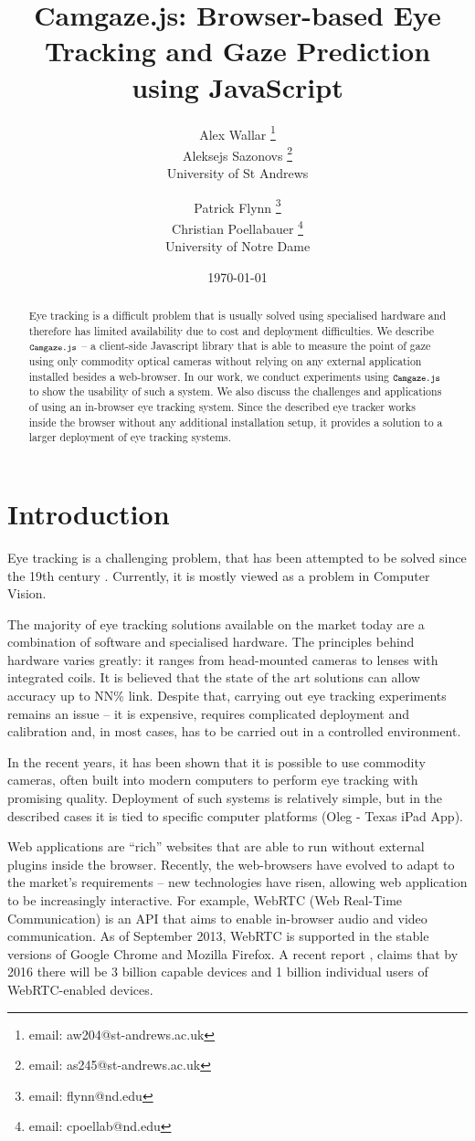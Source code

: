 \documentclass[annual]{acmsiggraph}
\title{Camgaze.js: Browser-based Eye Tracking and Gaze Prediction using
JavaScript}
\author{Alex Wallar \thanks{email: aw204@st-andrews.ac.uk} \\ Aleksejs Sazonovs
\thanks{email: as245@st-andrews.ac.uk} \\ University of St Andrews \and Patrick
Flynn \thanks{email: flynn@nd.edu} \\ Christian Poellabauer \thanks{email:
cpoellab@nd.edu} \\ University of Notre Dame}
\date{\today}
\newcommand{\Acronym}[1]{\ensuremath{{\small{\texttt{#1}}}}}
\newcommand{\Name}{\Acronym{Camgaze.js}} \newcommand{\False}{\Constant{false}}
\newcommand{\Constant}[1]{\ensuremath{\small{\texttt{#1}}}}
\begin{document}
\maketitle

\begin{abstract}

Eye tracking is a difficult problem that is usually solved using specialised
hardware and therefore has limited availability due to cost and deployment
difficulties. We describe $\Name$ – a client-side Javascript library that is
able to measure the point of gaze using only commodity optical cameras without
relying on any external application installed besides a web-browser. In our work,
we conduct experiments using $\Name$ to show the usability of such a system.
We also discuss the challenges and applications of using an in-browser eye
tracking system. Since the described eye tracker works inside the browser
without any additional installation setup, it provides a solution to a larger
deployment of eye tracking systems.

\end{abstract}

\section{Introduction}

Eye tracking is a challenging problem, that has been attempted to be solved
since the 19th century \cite{Ahrens1891}. Currently, it is mostly viewed as a
problem in Computer Vision.

The majority of eye tracking solutions available on the market today are a
combination of software and specialised hardware. The principles behind
hardware varies greatly: it ranges from head-mounted cameras to lenses with
integrated coils. It is believed that the state of the art solutions can allow
accuracy up to NN\% {link}. Despite that, carrying out eye tracking experiments
remains an issue – it is expensive, requires complicated deployment and
calibration and, in most cases, has to be carried out in a controlled
environment.

In the recent years, it has been shown \cite{SanAgustin2009}\cite{Sewell2010}
that it is possible to use commodity cameras, often built into modern
computers to perform eye tracking with promising quality. Deployment of such
systems is relatively simple, but in the described cases it is tied to specific
computer platforms (Oleg - Texas iPad App).

Web applications are “rich” websites that are able to run without external
plugins inside the browser. Recently, the web-browsers have evolved to adapt to
the market’s requirements – new technologies have risen, allowing web
application to be increasingly interactive. For example, WebRTC (Web Real-Time
Communication) is an API that aims to enable in-browser audio and video
communication. As of September 2013, WebRTC is supported in the stable versions
of Google Chrome and Mozilla Firefox. A recent report
\cite{DisruptiveAnalysis2013}, claims that by 2016 there will be
3 billion capable devices and 1 billion individual users of WebRTC-enabled
devices.
\end{document}
